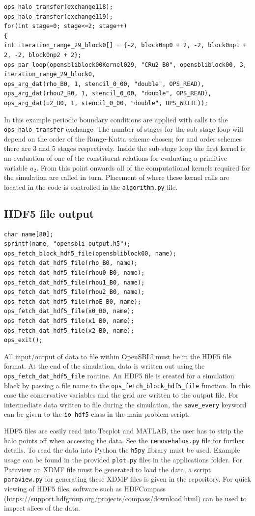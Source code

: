 \documentclass[11pt]{article}
\begin{document}
\begin{lstlisting}
ops_halo_transfer(exchange118);
ops_halo_transfer(exchange119);
for(int stage=0; stage<=2; stage++)
{
int iteration_range_29_block0[] = {-2, block0np0 + 2, -2, block0np1 + 2, -2, block0np2 + 2};
ops_par_loop(opensbliblock00Kernel029, "CRu2_B0", opensbliblock00, 3, iteration_range_29_block0,
ops_arg_dat(rho_B0, 1, stencil_0_00, "double", OPS_READ),
ops_arg_dat(rhou2_B0, 1, stencil_0_00, "double", OPS_READ),
ops_arg_dat(u2_B0, 1, stencil_0_00, "double", OPS_WRITE));
\end{lstlisting}
In this example periodic boundary conditions are applied with calls to the \verb|ops_halo_transfer| exchange. The number of stages for the sub-stage loop will depend on the order of the Runge-Kutta scheme chosen; for  and  order schemes there are 3 and 5 stages respectively. Inside the sub-stage loop the first kernel is an evaluation of one of the constituent relations for evaluating a primitive variable $u_2$. From this point onwards all of the computational kernels required for the simulation are called in turn. Placement of where these kernel calls are located in the code is controlled in the \verb|algorithm.py| file. 


\subsection{HDF5 file output}
\begin{lstlisting}
char name[80];
sprintf(name, "opensbli_output.h5");
ops_fetch_block_hdf5_file(opensbliblock00, name);
ops_fetch_dat_hdf5_file(rho_B0, name);
ops_fetch_dat_hdf5_file(rhou0_B0, name);
ops_fetch_dat_hdf5_file(rhou1_B0, name);
ops_fetch_dat_hdf5_file(rhou2_B0, name);
ops_fetch_dat_hdf5_file(rhoE_B0, name);
ops_fetch_dat_hdf5_file(x0_B0, name);
ops_fetch_dat_hdf5_file(x1_B0, name);
ops_fetch_dat_hdf5_file(x2_B0, name);
ops_exit();
\end{lstlisting}
All input/output of data to file within OpenSBLI must be in the HDF5 file format. At the end of the simulation, data is written out using the \verb|ops_fetch_dat_hdf5_file| routine. An HDF5 file is created for a simulation block by passing a file name to the \verb|ops_fetch_block_hdf5_file| function. In this case the conservative variables and the grid are written to the output file. For intermediate data written to file during the simulation, the \verb|save_every| keyword can be given to the \verb|io_hdf5| class in the main problem script. 

HDF5 files are easily read into Tecplot and MATLAB, the user has to strip the halo points off when accessing the data. See the \verb|removehalos.py| file for further details. To read the data into Python the \verb|h5py| library must be used. Example usage can be found in the provided \verb|plot.py| files in the applications folder. For Paraview an XDMF file must be generated to load the data, a script \verb|paraview.py| for generating these XDMF files is given in the repository. For quick viewing of HDF5 files, software such as HDFCompass (\url{https://support.hdfgroup.org/projects/compass/download.html}) can be used to inspect slices of the data.
\end{document}
